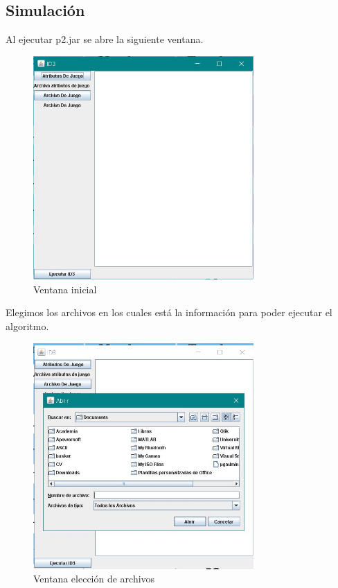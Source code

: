 \documentclass[12pt]{article}
\begin{document}
\subsection{Simulación}
Al ejecutar p2.jar se abre la siguiente ventana.
\begin{figure}[H]
    \centering
    \includegraphics[width=0.75\textwidth]{ventana.JPG}
    \caption{Ventana inicial}
\end{figure}
Elegimos los archivos en los cuales está la información para poder ejecutar el algoritmo.
\begin{figure}[H]
    \centering
    \includegraphics[width=0.75\textwidth]{click.JPG}
    \caption{Ventana elección de archivos}
\end{figure}
\end{document}
